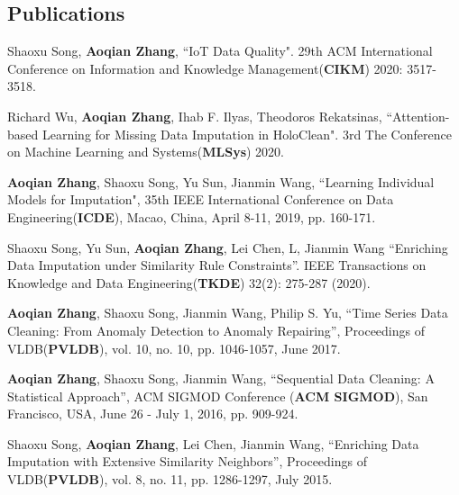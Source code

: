 \documentclass[margin]{cv}
\begin{document}
\begin{resume}
\section{\sc Publications}


\begin{enumerate}[{[}1{]}]
\item {Shaoxu Song}, {\bf Aoqian Zhang}, ``IoT Data Quality". 29th ACM International Conference on Information and Knowledge Management({\bf CIKM}) 2020: 3517-3518.

\item {Richard Wu}, {\bf Aoqian Zhang}, {Ihab F. Ilyas}, {Theodoros Rekatsinas}, ``Attention-based Learning for Missing Data Imputation in HoloClean". 3rd The Conference on Machine Learning and Systems({\bf MLSys}) 2020.


\item {\bf Aoqian Zhang}, {Shaoxu Song}, {Yu Sun}, {Jianmin Wang}, ``Learning Individual Models for Imputation", 35th {IEEE} International Conference on Data Engineering({\bf ICDE}), Macao, China, April 8-11, 2019, pp. 160-171. 

\item {Shaoxu Song}, {Yu Sun}, {\bf Aoqian Zhang}, {Lei Chen, L}, {Jianmin Wang}  ``Enriching Data Imputation under Similarity Rule Constraints''. IEEE Transactions on Knowledge and Data Engineering({\bf TKDE}) 32(2): 275-287 (2020).

\item {\bf Aoqian Zhang}, {Shaoxu Song}, {Jianmin Wang}, {Philip S. Yu}, ``Time Series Data Cleaning: From Anomaly Detection to Anomaly Repairing'', Proceedings of VLDB({\bf PVLDB}), vol. 10, no. 10, pp. 1046-1057, June 2017.

\item {\bf Aoqian Zhang}, Shaoxu Song, Jianmin Wang, ``Sequential Data Cleaning: A Statistical Approach'', ACM SIGMOD Conference ({\bf ACM SIGMOD}), San Francisco, USA, June 26 - July 1, 2016, pp. 909-924.

\item {Shaoxu Song}, {\bf Aoqian Zhang}, {Lei Chen}, {Jianmin Wang}, ``Enriching Data Imputation with Extensive Similarity Neighbors'', Proceedings of VLDB({\bf PVLDB}), vol. 8, no. 11, pp. 1286-1297, July 2015.


\end{enumerate}
\end{resume}
\end{document}
